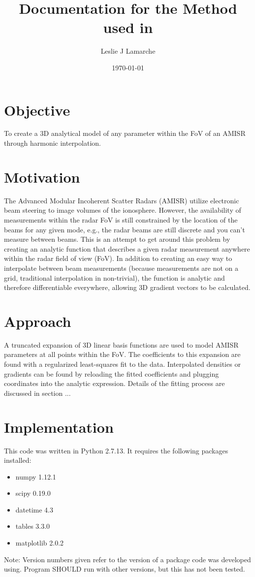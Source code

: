 \documentclass[12pt,letterpaper]{article}
\title{Documentation for the Method used in \plaintext{amisr\_fit.py}}
\author{Leslie J Lamarche}
\date{\today}
\begin{document}
\maketitle

\section{Objective}
  To create a 3D analytical model of any parameter within the FoV of an AMISR through harmonic interpolation.

\section{Motivation}
  The Advanced Modular Incoherent Scatter Radars (AMISR) utilize electronic beam steering to image volumes of the ionosphere.  However, the availability of measurements within the radar FoV is still constrained by the location of the beams for any given mode, e.g., the radar beams are still discrete and you can't measure between beams.  This is an attempt to get around this problem by creating an analytic function that describes a given radar measurement anywhere within the radar field of view (FoV).  In addition to creating an easy way to interpolate between beam measurements (because measurements are not on a grid, traditional interpolation in non-trivial), the function is analytic and therefore differentiable everywhere, allowing 3D gradient vectors to be calculated.

\section{Approach}
  A truncated expansion of 3D linear basis functions are used to model AMISR parameters at all points within the FoV.  The coefficients to this expansion are found with a regularized least-squares fit to the data.  Interpolated densities or gradients can be found by reloading the fitted coefficients and plugging coordinates into the analytic expression.  Details of the fitting process are discussed in section ...

\section{Implementation}
  This code was written in Python 2.7.13.  It requires the following packages installed:
  \begin{itemize}
    \item numpy 1.12.1
    \item scipy 0.19.0
    \item datetime 4.3
    \item tables 3.3.0
    \item matplotlib 2.0.2
  \end{itemize}
  Note: Version numbers given refer to the version of a package code was developed using.  Program SHOULD run with other versions, but this has not been tested.
\end{document}
